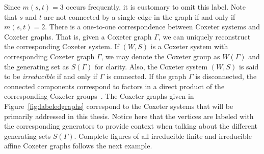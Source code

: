 Since $m(s,t)=3$ occurs frequently, it is customary to omit this label. Note that $s$ and $t$ are not connected by a single edge in the graph if and only if $m(s,t)=2$. There is a one-to-one correspondence between Coxeter systems and Coxeter graphs. That is, given a Coxeter graph $\Gamma$, we can uniquely reconstruct the corresponding Coxeter system. If $(W,S)$ is a Coxeter system with corresponding Coxeter graph $\Gamma$, we may denote the Coxeter group as $W(\Gamma)$ and the generating set as $S(\Gamma)$ for clarity. Also, the Coxeter system $(W,S)$ is said to be \emph{irreducible} if and only if $\Gamma$ is connected. If the graph $\Gamma$ is disconnected, the connected components correspond to factors in a direct product of the corresponding Coxeter groups~\cite{Humphreys1990}. The Coxeter graphs given in Figure~\ref{fig:labeledgraphs} correspond to the Coxeter systems that will be primarily addressed in this thesis. Notice here that the vertices are labeled with the corresponding generators to provide context when talking about the different generating sets $S(\Gamma)$. Complete figures of all irreducible finite and irreducible affine Coxeter graphs follows the next example.

